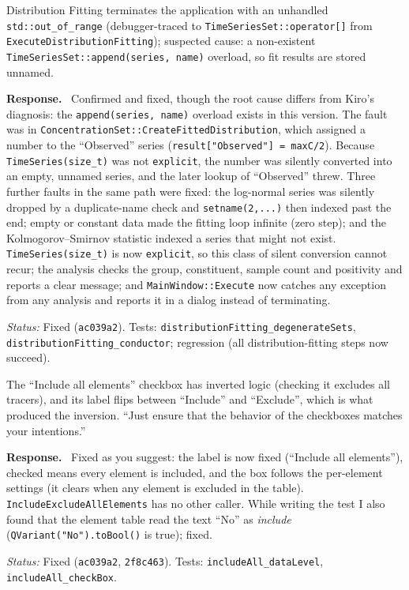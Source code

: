 \documentclass[11pt]{article}
\newcommand{\code}[1]{\texttt{#1}}
\newcommand{\commit}[1]{\texttt{#1}}
\newcounter{cmt}
\newcounter{grp}
\renewcommand{\thecmt}{\thegrp.\arabic{cmt}}
\newenvironment{reviewer}[1]{%
  \refstepcounter{cmt}%
  \begin{tcolorbox}[enhanced,breakable,colback=commentbg,colframe=usgsgreen!60,
    boxrule=0.4pt,left=6pt,right=6pt,top=4pt,bottom=4pt,
    title={\small\textbf{Comment \thecmt}\hfill\textit{#1}},
    coltitle=black,colbacktitle=usgsgreen!15,fonttitle=\small]}%
  {\end{tcolorbox}}
\newenvironment{response}{\par\noindent\textbf{Response.}\ }{\par\medskip}
\newcommand{\status}[1]{\par\noindent\textit{Status:} #1\par}
\begin{document}
\begin{reviewer}{Email 10/15; Summary; Tests, Test 7}
Distribution Fitting terminates the application with an unhandled
\code{std::\allowbreak{}out\_\allowbreak{}of\_\allowbreak{}range} (debugger-traced to \code{TimeSeriesSet::\allowbreak{}operator[]}
from \code{ExecuteDistributionFitting}); suspected cause: a non-existent
\code{TimeSeriesSet::\allowbreak{}append(series, name)} overload, so fit results are stored
unnamed.
\end{reviewer}
\begin{response}
Confirmed and fixed, though the root cause differs from Kiro's diagnosis: the
\code{append(series, name)} overload exists in this version. The fault was
in \code{ConcentrationSet::\allowbreak{}CreateFittedDistribution}, which assigned a number
to the ``Observed'' series (\code{result["Observed"] = maxC/\allowbreak{}2}). Because
\code{TimeSeries(size\_\allowbreak{}t)} was not \code{explicit}, the number was silently
converted into an empty, unnamed series, and the later lookup of
``Observed'' threw. Three further faults in the same path were fixed: the
log-normal series was silently dropped by a duplicate-name check and
\code{setname(2,...)} then indexed past the end; empty or constant data made
the fitting loop infinite (zero step); and the Kolmogorov--Smirnov statistic
indexed a series that might not exist. \code{TimeSeries(size\_\allowbreak{}t)} is now
\code{explicit}, so this class of silent conversion cannot recur; the analysis
checks the group, constituent, sample count and positivity and reports a
clear message; and \code{MainWindow::\allowbreak{}Execute} now catches any exception from
any analysis and reports it in a dialog instead of terminating.
\end{response}
\status{Fixed (\commit{ac039a2}). Tests: \code{distributionFitting\_\allowbreak{}degenerateSets},
\code{distributionFitting\_\allowbreak{}conductor}; regression (all distribution-fitting steps now succeed).}

\begin{reviewer}{Email 10/15; Summary; Tests, G1 and G2}
The ``Include all elements'' checkbox has inverted logic (checking it
excludes all tracers), and its label flips between ``Include'' and
``Exclude'', which is what produced the inversion. ``Just ensure that the
behavior of the checkboxes matches your intentions.''
\end{reviewer}
\begin{response}
Fixed as you suggest: the label is now fixed (``Include all elements''),
checked means every element is included, and the box follows the
per-element settings (it clears when any element is excluded in the table).
\code{IncludeExcludeAllElements} has no other caller. While writing the test
I also found that the element table read the text ``No'' as \emph{include}
(\code{QVariant("No").\allowbreak{}toBool()} is true); fixed.
\end{response}
\status{Fixed (\commit{ac039a2}, \commit{2f8c463}). Tests: \code{includeAll\_\allowbreak{}dataLevel}, \code{includeAll\_\allowbreak{}checkBox}.}
\end{document}
